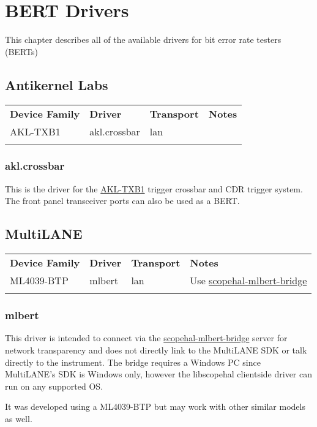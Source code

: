 \chapter{BERT Drivers}
\label{sec:bert-drivers}

This chapter describes all of the available drivers for bit error rate testers (BERTs)

\section{Antikernel Labs}

\begin{tabularx}{16cm}{lllX}
\thickhline
\textbf{Device Family} & \textbf{Driver} & \textbf{Transport} & \textbf{Notes} \\
\thickhline
AKL-TXB1 & akl.crossbar & lan &  \\
\thickhline
\end{tabularx}

\subsection{akl.crossbar}

This is the driver for the \href{https://github.com/azonenberg/triggercrossbar}{AKL-TXB1} trigger crossbar and CDR
trigger system. The front panel transceiver ports can also be used as a BERT.

\section{MultiLANE}

\begin{tabularx}{16cm}{lllX}
\thickhline
\textbf{Device Family} & \textbf{Driver} & \textbf{Transport} & \textbf{Notes} \\
\thickhline
ML4039-BTP & mlbert & lan & Use \href{https://github.com/ngscopeclient/scopehal-mlbert-bridge}{scopehal-mlbert-bridge} \\
\thickhline
\end{tabularx}

\subsection{mlbert}

This driver is intended to connect via the
\href{https://github.com/ngscopeclient/scopehal-mlbert-bridge}{scopehal-mlbert-bridge} server for network transparency
and does not directly link to the MultiLANE SDK or talk directly to the instrument. The bridge requires a Windows PC
since MultiLANE's SDK is Windows only, however the libscopehal clientside driver can run on any supported OS.

It was developed using a ML4039-BTP but may work with other similar models as well.
